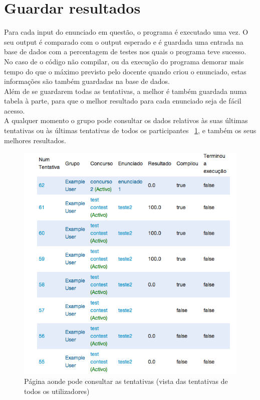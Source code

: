 \section{Guardar resultados}\label{sec res}
Para cada input do enunciado em questão, o programa é executado uma vez. O seu output é comparado com o output esperado e 
é guardada uma entrada na base de dados com a percentagem de testes nos quais o programa teve sucesso.\\
No caso de o código não compilar, ou da execução do programa demorar mais tempo do que o máximo previsto pelo docente quando 
criou o enunciado, estas informações são também guardadas na base de dados.\\
Além de se guardarem todas as tentativas, a melhor é também guardada numa tabela à parte, para que o melhor resultado para cada
enunciado seja de fácil acesso.\\
A qualquer momento o grupo pode consultar os dados relativos às suas últimas tentativas ou às últimas tentativas de todos os participantes ~\ref{img:tentativas}, e também os seus melhores resultados.\\

\begin{figure}[H]
\begin{center}
\includegraphics[scale=0.60]{Images/tentativas}
\caption{Página aonde pode consultar as tentativas (vista das tentativas de todos os utilizadores)}\label{img:tentativas}
\end{center}
\end{figure}